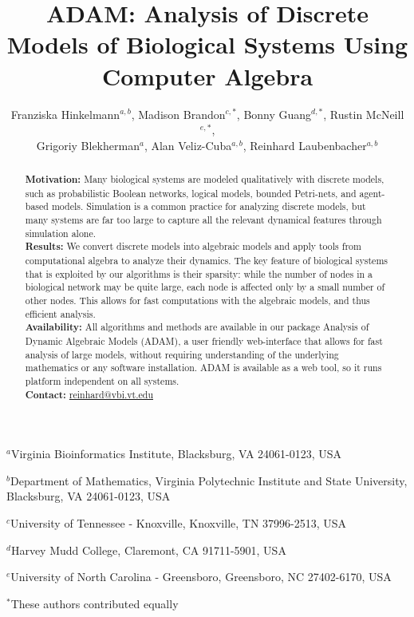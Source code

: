 \documentclass[11pt]{amsart}
\title{ADAM: Analysis of Discrete Models of Biological
Systems Using Computer Algebra}
\author{Franziska Hinkelmann$^{a,b}$,
Madison Brandon$^{c,*}$,
Bonny Guang$^{d,*}$,
Rustin McNeill$^{e,*}$, \\
Grigoriy Blekherman$^{a}$,
Alan Veliz-Cuba$^{a,b}$,
Reinhard Laubenbacher$^{a,b}$}
\begin{document}
\maketitle
{\footnotesize
              \centerline{$^a$Virginia Bioinformatics Institute, Blacksburg, VA 24061-0123, USA}
}
{\footnotesize
              \centerline{$^b$Department of Mathematics,
               Virginia Polytechnic Institute and State University, Blacksburg, VA 24061-0123, USA}
}
{\footnotesize
              \centerline{$^c$University of Tennessee - Knoxville, Knoxville, TN 37996-2513, USA}
}
{\footnotesize
              \centerline{$^d$Harvey Mudd College, Claremont, CA 91711-5901, USA}
}
{\footnotesize
              \centerline{$^e$University of North Carolina - Greensboro, Greensboro, NC 27402-6170, USA}
}
{\footnotesize
              \centerline{$^*$These authors contributed equally}
}
\begin{abstract}
{\bf Motivation:} Many biological systems are modeled qualitatively with discrete models, such as
probabilistic Boolean networks, logical models, bounded Petri-nets, and agent-based models.
Simulation is a common practice for analyzing discrete models, but many systems are far too large
to capture all the relevant dynamical features through simulation alone. \\
{\bf Results:} We convert discrete models into algebraic models
and apply tools from computational algebra to analyze their dynamics.
The key feature of biological systems that is exploited by our algorithms is their sparsity: while the number of nodes in a
biological network may be quite large, each node is affected only by a small number of other nodes.
This allows for fast
computations with the algebraic models, and thus efficient analysis.\\
{\bf Availability:} All algorithms and methods are available in our package Analysis of Dynamic
Algebraic Models (ADAM), a user friendly web-interface
that allows for fast analysis of large models, without requiring understanding of the underlying mathematics or any software installation. ADAM is available as a web tool, so it runs platform independent on all systems.\\
{\bf Contact:} \href{mailto:reinhard@vbi.vt.edu}{reinhard@vbi.vt.edu}\\
\end{abstract}
\end{document}
